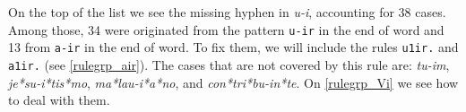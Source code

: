



On the top of the list we see the missing hyphen in \emph{u-i}, accounting for
38 cases. Among those, 34 were originated from the pattern \texttt{u-ir} in the
end of word and 13 from \texttt{a-ir} in the end of word. 
To fix them, we will include the rules \texttt{u1ir.} and \texttt{a1ir.} (see 
\cref{rulegrp_air}). The cases that are not covered by this rule are:
\emph{tu-im}, \emph{je*su-i*tis*mo}, \emph{ma*lau-i*a*no}, and
\emph{con*tri*bu-in*te}. On \cref{rulegrp_Vi} we see how to deal with
them.


